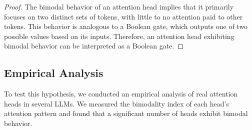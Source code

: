 \begin{proof}






The bimodal behavior of an attention head implies that it primarily focuses on two distinct sets of tokens, with little to no attention paid to other tokens. This behavior is analogous to a Boolean gate, which outputs one of two possible values based on its inputs. Therefore, an attention head exhibiting bimodal behavior can be interpreted as a Boolean gate.






\end{proof}













\subsection{Empirical Analysis}






To test this hypothesis, we conducted an empirical analysis of real attention heads in several LLMs. We measured the bimodality index of each head's attention pattern and found that a significant number of heads exhibit bimodal behavior.













